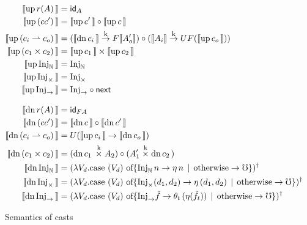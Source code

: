 \begin{figure*}
  
  \begin{align*}
    \sem{\upc{r(A)}} &= \id_A \\
    \sem{\upc{(c \comp c')}} &= \sem{\upc{c'}} \circ \sem{\upc{c}} \\
    \sem{\upc{(c_i \ra c_o)}} &= (\sem{\dnc {c_i}} \tok F\sem{A_o'})\circ (\sem{A_i} \tok UF(\sem{\upc {c_o}}))\\
    \sem{\upc{(c_1 \times c_2)}} &= \sem{\upc{c_1}} \times \sem{\upc{c_2}}\\
    \sem{\upc{\inat}} &= \inat\\
    \sem{\upc{\itimes}} &= \itimes\\
    \sem{\upc{\iarr}} &= \iarr \circ \nxt\\[2ex]
    \sem{\dnc{r(A)}} &= \id_{FA} \\
    \sem{\dnc{(c \comp c')}} &= \sem{\dnc{c}} \circ \sem{\dnc{c'}} \\
    \sem{\dnc{(c_i \ra c_o)}} &= U(\sem{\upc {c_i}} \to \sem{\dnc {c_o}})\\
    \sem{\dnc{(c_1 \times c_2)}} &= (\dnc{c_1} \timesk A_2) \circ (A_1' \timesk \dnc{c_2}) \\
    \sem{\dnc{\inat}} &= (
      \lambda V_d . \text{case $({V_d})$ of}
      \{ \inat\,n \to \eta\, n
         \alt \text{otherwise} \to \mho \})^\dagger \\
    \sem{\dnc{\itimes}} &= (
      \lambda V_d . \text{case $({V_d})$ of}
      \{ \itimes(d_1, d_2) \to \eta\, (d_1, d_2)
         \alt \text{otherwise} \to \mho \})^\dagger \\
    \sem{\dnc{\iarr}} &= (
      \lambda V_d . \text{case $({V_d})$ of}
      \{ \iarr \tilde{f} \to \theta_t\, (\eta (\tilde{f}_t))
         \alt \text{otherwise} \to \mho \})^\dagger \\
  \end{align*}
  \caption{Semantics of casts}
  \label{fig:term-semantics}
\end{figure*}

